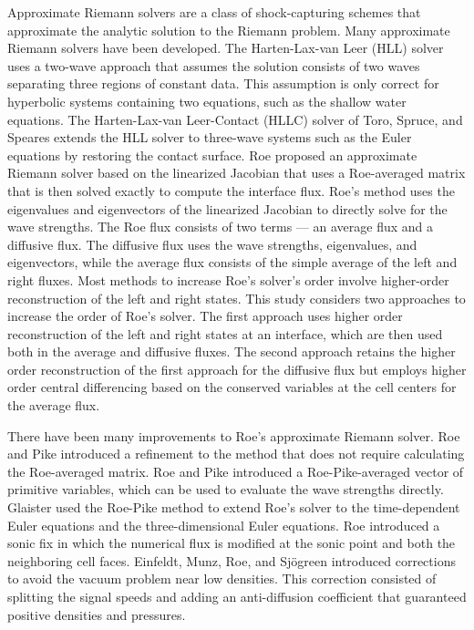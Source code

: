Approximate Riemann solvers are a class of shock-capturing schemes that approximate the analytic solution to the Riemann problem.  Many approximate Riemann solvers have been developed.  The Harten-Lax-van Leer (HLL) \cite{HARTENLAXVANLEER1983251} solver uses a two-wave approach that assumes the solution consists of two waves separating three regions of constant data. This assumption is only correct for hyperbolic systems containing two equations, such as the shallow water equations. The Harten-Lax-van Leer-Contact (HLLC) solver of Toro, Spruce, and Speares \cite{TOROSPRUCESPEARES199441} extends the HLL solver to three-wave systems such as the Euler equations by restoring the contact surface. Roe \cite{ROE1997250} proposed an approximate Riemann solver based on the linearized Jacobian that uses a Roe-averaged matrix that is then solved exactly to compute the interface flux. Roe's method uses the eigenvalues and eigenvectors of the linearized Jacobian to directly solve for the wave strengths. The Roe flux consists of two terms --- an average flux and a diffusive flux. The diffusive flux uses the wave strengths, eigenvalues, and eigenvectors, while the average flux consists of the simple average of the left and right fluxes. Most methods to increase Roe's solver's order involve higher-order reconstruction of the left and right states. This study considers two approaches to increase the order of Roe's solver. The first approach uses higher order reconstruction of the left and right states at an interface, which are then used both in the average and diffusive fluxes. The second approach retains the higher order reconstruction of the first approach for the diffusive flux but employs higher order central differencing based on the conserved variables at the cell centers for the average flux.

There have been many improvements to Roe's approximate Riemann solver. Roe and Pike \cite{ROEPIKE1985} introduced a refinement to the method that does not require calculating the Roe-averaged matrix. Roe and Pike introduced a Roe-Pike-averaged vector of primitive variables, which can be used to evaluate the wave strengths directly. Glaister \cite{GLAISTER1988382,GLAISTER1988361} used the Roe-Pike method to extend Roe's solver to the time-dependent Euler equations and the three-dimensional Euler equations. Roe \cite{ROE1992132} introduced a sonic fix in which the numerical flux is modified at the sonic point and both the neighboring cell faces. Einfeldt, Munz, Roe, and Sjögreen \cite{EINFELDT1991273} introduced corrections to avoid the vacuum problem near low densities. This correction consisted of splitting the signal speeds and adding an anti-diffusion coefficient that guaranteed positive densities and pressures. 

